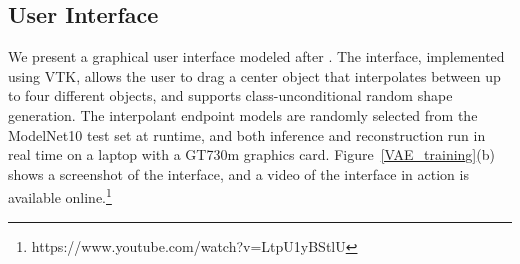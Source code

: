 \documentclass{article}
\begin{document}
\subsection{User Interface}
We present a graphical user interface modeled after \citep{GUI_REF}. The interface, implemented using VTK\citep{VTK}, allows the user to drag a center object that interpolates between up to four different objects, and supports class-unconditional random shape generation. The interpolant endpoint models are randomly selected from the ModelNet10 test set at runtime, and both inference and reconstruction run in real time on a laptop with a GT730m graphics card. Figure~\ref{VAE_training}(b) shows a screenshot of the interface, and a video of the interface in action is available online.\footnote{https://www.youtube.com/watch?v=LtpU1yBStlU}  
\end{document}
